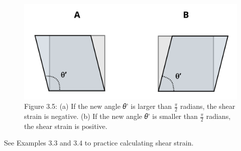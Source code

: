 \documentclass[
  letterpaper,
  DIV=11,
  numbers=noendperiod]{scrreprt}
\theoremstyle{definition}
\theoremstyle{remark}
\begin{document}
\begin{figure}[H]

{\centering \includegraphics[width=5.05208in,height=\textheight]{images/CH3 PNGs/figure 3.5.png}

}

\caption{Figure 3.5: (a) If the new angle 𝜃' is larger than
\(\frac{\pi}{2}\) radians, the shear strain is negative. (b) If the new
angle 𝜃' is smaller than \(\frac{\pi}{2}\) radians, the shear strain is
positive.}

\end{figure}%

See Examples 3.3 and 3.4 to practice calculating shear strain.
\end{document}
